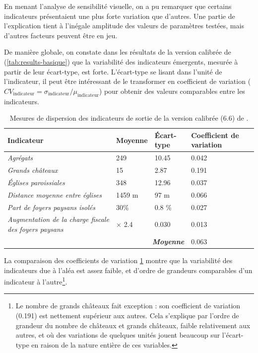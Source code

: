 En menant l'analyse de sensibilité visuelle, on a pu remarquer que certains indicateurs présentaient une plus forte variation que d'autres.
Une partie de l'explication tient à l'inégale amplitude des valeurs de paramètres testées, mais d'autres facteurs peuvent être en jeu.

De manière globale, on constate dans les résultats de la version calibrée de \simfeodal{} (\cref{tab:results-basique}) que la variabilité des indicateurs émergents, mesurée à partir de leur écart-type, est forte.
L'écart-type se lisant dans l'unité de l'indicateur, il peut être intéressant de le transformer en coefficient de variation ($CV_{\text{indicateur}} = \sigma_{\text{indicateur}}  /  \mu_{\text{indicateur}}$) pour obtenir des valeurs comparables entre les indicateurs. 


\begin{table}[H]
{\renewcommand{\arraystretch}{1.1}%
	\begin{tabular}{|p{5cm}|p{2.5cm}|p{2.5cm}|p{2.5cm}|}
\hline
\textbf{Indicateur} & \textbf{Moyenne} & \textbf{Écart-type} & \textbf{Coefficient de variation} \\
\hline
\textit{Agrégats} & 249 & 10.45 & 0.042\\
\hline
\textit{Grands châteaux} & 15 & 2.87 & 0.191\\
\hline
\textit{Églises paroissiales} & 348 & 12.96 & 0.037\\
\hline
\textit{Distance moyenne entre églises} & 1459 m & 97 m & 0.066\\
\hline
\textit{Part de foyers paysans isolés} & 30\% & 0.8 \% & 0.027\\
\hline
\textit{Augmentation de la charge fiscale des foyers paysans} & $\times$ 2.4 & 0.030 & 0.013\\
\hline
\multicolumn{3}{r|}{\textbf{\textit{Moyenne}}} & 0.063\\
\cline{4-4}
	\end{tabular}
}
\caption[Mesures de dispersion des indicateurs de sortie de \simfeodal{}.]{Mesures de dispersion des indicateurs de sortie de la version calibrée (6.6) de \simfeodal{}.}
\label{tab:variabilite-indicateurs}
\end{table}

La comparaison des coefficients de variation \cref{tab:variabilite-indicateurs} montre que la variabilité des indicateurs due à l'aléa est assez faible, et d'ordre de grandeurs comparables d'un indicateur à l'autre\footnote{
	Le nombre de grands châteaux fait exception : son coefficient de variation (0.191) est nettement supérieur aux autres.
	Cela s'explique par l'ordre de grandeur du nombre de châteaux et grands châteaux, faible relativement aux autres, et où des variations de quelques unités jouent beaucoup sur l'écart-type en raison de la nature entière de ces variables.
}.

